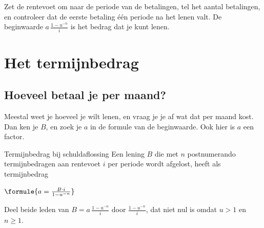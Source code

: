 
\begin{werkwijze}
Zet de rentevoet om naar de periode van de betalingen, tel het aantal betalingen, en controleer dat de eerste betaling één periode na het lenen valt. De beginwaarde $a\,\frac{1 - u^{-n}}{i}$ is het bedrag dat je kunt lenen.
\end{werkwijze}


\begin{oefeningen}
\end{oefeningen}

\section{Het termijnbedrag}

\subsection{Hoeveel betaal je per maand?}

Meestal weet je hoeveel je wilt lenen, en vraag je je af wat dat per maand kost. Dan ken je $B$, en zoek je $a$ in de formule van de beginwaarde. Ook hier is $a$ een factor.

\begin{theorie}
\begin{stelling}{Termijnbedrag bij schuldaflossing}
Een lening $B$ die met $n$ postnumerando termijnbedragen aan rentevoet $i$ per periode wordt afgelost, heeft als termijnbedrag

\vspace{1mm}
\qquad $\formule{a = \frac{B \cdot i}{1 - u^{-n}}}$
\end{stelling}

\begin{bewijs}
Deel beide leden van $B = a\,\frac{1 - u^{-n}}{i}$ door $\frac{1 - u^{-n}}{i}$, dat niet nul is omdat $u > 1$ en $n \geqslant 1$.
\end{bewijs}
\end{theorie}

